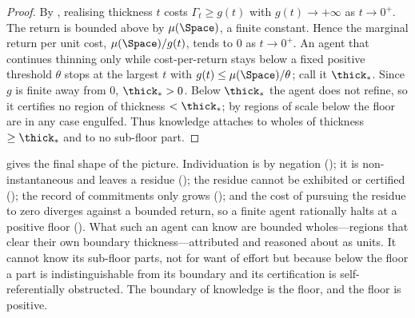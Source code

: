 \begin{proof}
By , realising thickness $t$ costs $\Gamma_t\ge g(t)$ with
$g(t)\to+\infty$ as $t\to0^+$. The return is bounded above by $\mu(\Space)$, a
finite constant. Hence the marginal return per unit cost,
$\mu(\Space)/g(t)$, tends to $0$ as $t\to0^+$. An agent that continues thinning
only while cost-per-return stays below a fixed positive threshold $\theta$ stops
at the largest $t$ with $g(t)\le\mu(\Space)/\theta$; call it $\thick_\ast$. Since
$g$ is finite away from $0$, $\thick_\ast>0$. Below $\thick_\ast$ the agent does
not refine, so it certifies no region of thickness $<\thick_\ast$; by
 regions of scale below the floor are in any case
engulfed. Thus knowledge attaches to wholes of thickness $\ge\thick_\ast$ and to
no sub-floor part.
\end{proof}

\begin{remark}
\label{rem:wholes}
 gives the final shape of the picture. Individuation is by
negation (); it is non-instantaneous and leaves a
residue (); the residue cannot be exhibited or certified
(); the record of commitments only grows
(); and the cost of pursuing the residue to zero diverges
against a bounded return, so a finite agent rationally halts at a positive floor
(). What such an agent can know are bounded wholes---regions
that clear their own boundary thickness---attributed and reasoned about as units.
It cannot know its sub-floor parts, not for want of effort but because below the
floor a part is indistinguishable from its boundary and its certification is
self-referentially obstructed. The boundary of knowledge is the floor, and the
floor is positive.
\end{remark}
